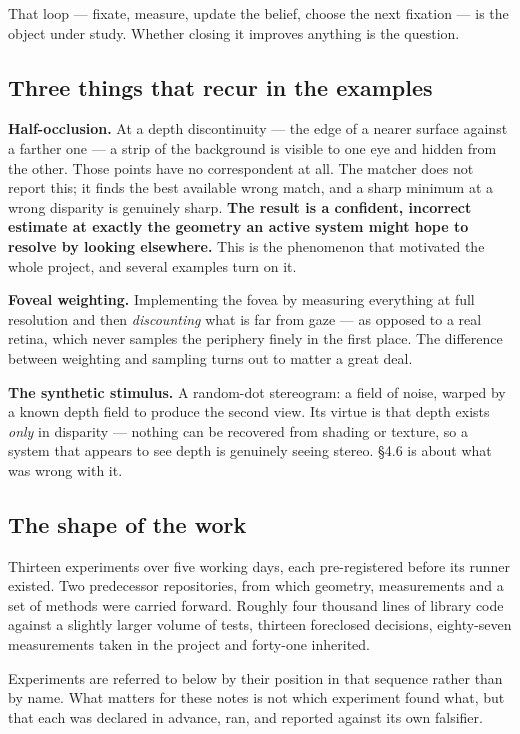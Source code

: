That loop --- fixate, measure, update the belief, choose the next fixation --- is the object under study. Whether closing it improves anything is the question.

\subsection{Three things that recur in the examples}

\textbf{Half-occlusion.} At a depth discontinuity --- the edge of a nearer surface against a farther one --- a strip of the background is visible to one eye and hidden from the other. Those points have no correspondent at all. The matcher does not report this; it finds the best available wrong match, and a sharp minimum at a wrong disparity is genuinely sharp. \textbf{The result is a confident, incorrect estimate at exactly the geometry an active system might hope to resolve by looking elsewhere.} This is the phenomenon that motivated the whole project, and several examples turn on it.

\textbf{Foveal weighting.} Implementing the fovea by measuring everything at full resolution and then \textit{discounting} what is far from gaze --- as opposed to a real retina, which never samples the periphery finely in the first place. The difference between weighting and sampling turns out to matter a great deal.

\textbf{The synthetic stimulus.} A random-dot stereogram: a field of noise, warped by a known depth field to produce the second view. Its virtue is that depth exists \textit{only} in disparity --- nothing can be recovered from shading or texture, so a system that appears to see depth is genuinely seeing stereo. \S4.6 is about what was wrong with it.

\subsection{The shape of the work}

Thirteen experiments over five working days, each pre-registered before its runner existed. Two predecessor repositories, from which geometry, measurements and a set of methods were carried forward. Roughly four thousand lines of library code against a slightly larger volume of tests, thirteen foreclosed decisions, eighty-seven measurements taken in the project and forty-one inherited.

Experiments are referred to below by their position in that sequence rather than by name. What matters for these notes is not which experiment found what, but that each was declared in advance, ran, and reported against its own falsifier.


